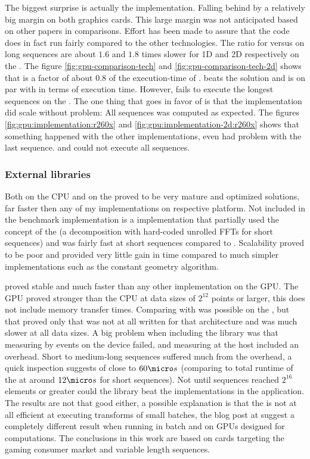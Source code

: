 The biggest surprise is actually the {\OCL} implementation. Falling behind by a relatively big margin on both graphics cards. This large margin was not anticipated based on other papers in comparisons. Effort has been made to assure that the code does in fact run fairly compared to the other technologies. The ratio for {\OCL} versus {\CU} on long sequences are about $1.6$ and $1.8$ times slower for 1D and 2D respectively on the {\NVCARD}. The figure \ref{fig:gpu-comparison-tech} and \ref{fig:gpu-comparison-tech-2d} shows that {\DX} is a factor of about $0.8$ of the execution-time of {\OCL}. {\GL} beats the {\OCL} solution and is on par with {\DX} in terms of execution time. However, fails to execute the longest sequences on the {\AMDCARD}. The one thing that goes in favor of {\OCL} is that the implementation did scale without problem: All sequences was computed as expected. The figures \ref{fig:gpu:implementation:r260x} and \ref{fig:gpu:implementation-2d:r260x} shows that something happened with the other implementations, even {\CLFFT} had problem with the last sequence. {\GL} and {\DX} could not execute all sequences.

\subsubsection{External libraries}

Both {\FFTW} on the CPU and {\CUFFT} on the {\NVCARD} proved to be very mature and optimized solutions, far faster then any of my implementations on respective platform. Not included in the benchmark implementation is a {\CPP} implementation that partially used the concept of the {\FFTW} (a decomposition with hard-coded unrolled FFTs for short sequences) and was fairly fast at short sequences compared to {\FFTW}. Scalability proved to be poor and provided very little gain in time compared to much simpler implementations such as the constant geometry algorithm.

{\CUFFT} proved stable and much faster than any other implementation on the GPU. The GPU proved stronger than the CPU at data sizes of $2^{12}$ points or larger, this does not include memory transfer times. Comparing {\CUFFT} with {\CLFFT} was possible on the {\NVCARD}, but that proved only that {\CLFFT} was not at all written for that architecture and was much slower at all data sizes. A big problem when including the {\CLFFT} library was that measuring by events on the device failed, and measuring at the host included an overhead. Short to medium-long sequences suffered much from the overhead, a quick inspection suggests of close to $60{\micro}s$ (comparing to total runtime of the {\OCL} at around $12{\micro}s$ for short sequences). Not until sequences reached $2^{16}$ elements or greater could the library beat the implementations in the application. The results are not that good either, a possible explanation is that the {\CLFFT} is not at all efficient at executing transforms of small batches, the blog post at \cite{amd2015performance} suggest a completely different result when running in batch and on GPUs designed for computations. The conclusions in this work are based on cards targeting the gaming consumer market and variable length sequences.

